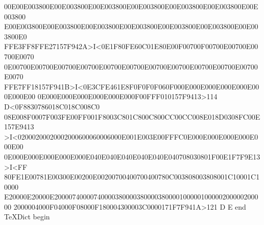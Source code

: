 00E00E003800E00E003800E00E003800E00E003800E00E003800E00E003800E00E003800
E00E003800E00E003800E00E003800E00E003800E00E003800E00E003800E00E003800E0
FFE3FF8FFE27157F942A>I<0E1F80FE60C01E80E00F00700F00700E00700E00700E0070
0E00700E00700E00700E00700E00700E00700E00700E00700E00700E00700E00700E0070
FFE7FF18157F941B>I<0E3CFE461E8F0F0F0F060F000E000E000E000E000E000E000E00
0E000E000E000E000E000E000F00FFF010157F9413>114 D<0F8830786018C018C008C0
08E008F0007F003FE00FF001F8003C801C800C800CC00CC008E018D0308FC00E157E9413
>I<02000200020002000600060006000E001E003E00FFFC0E000E000E000E000E000E00
0E000E000E000E000E000E040E040E040E040E040E040708030801F00E1F7F9E13>I<FF
80FE1E00781E00300E00200E00200700400700400780C003808003808001C10001C10000
E20000E20000E20000740000740000380000380000380000100000100000200000200000
2000004000F04000F08000F180004300003C0000171F7F941A>121
D E
end
TeXDict begin

